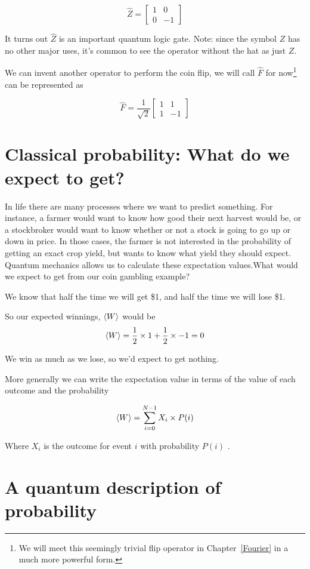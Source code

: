 $$ \hat{Z} = \begin{bmatrix} 1 & 0 \\ 0 & -1 \end{bmatrix} $$

It turns out $\hat{Z}$ is an important quantum logic gate. Note: since the symbol $Z$ has no other major uses, it's common to see the operator without the hat as just $Z$.


We can invent another operator to perform the coin flip, we will call $\hat{F}$ for now\footnote{We will meet this seemingly trivial flip operator in Chapter~\ref{Fourier} in a much more powerful form.} can be represented as 

$$
\hat{F} =  \frac{1}{\sqrt{2}} \begin{bmatrix} 1 & 1 \\ 1 & -1 \end{bmatrix}
$$

\section{Classical probability: What do we expect to get?}

In life there are many processes where we want to predict something. For instance, a farmer would want to know how good their next harvest would be, or a stockbroker would want to know whether or not a stock is going to go up or down in price. In those cases, the farmer is not interested in the probability of getting an exact crop yield, but wants to know what yield they should expect. Quantum mechanics allows us to calculate these expectation values.What would we expect to get from our coin gambling example? 

We know that half the time we will get \$1, and half the time we will lose \$1. 

So our expected winnings, $\braket{W}$ would be
$$\braket{W} = \frac{1}{2} \times 1 + \frac{1}{2} \times -1 =0 $$

We win as much as we lose, so we'd expect to get nothing. 

More generally we can write the expectation value in terms of the value of each outcome and the probability 

$$ \braket{W} = \sum_{i = 0}^{N-1} X_i \times P(i) $$

Where $X_i$ is the outcome for event $i$ with probability $P(i)$ . 


\section{ A quantum description of probability }
\label{sec:quantum_probability}

